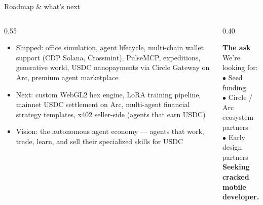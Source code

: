 \documentclass[aspectratio=169]{beamer}
\begin{document}
\begin{frame}{Roadmap \& what's next}
  \vspace{16pt}
  \begin{columns}[T]
    \begin{column}{0.55\textwidth}
      \begin{itemize}
        \footnotesize
        \item \alert{Shipped:} office simulation, agent lifecycle, multi-chain wallet support (CDP Solana, Crossmint), PulseMCP, expeditions, generative world, USDC nanopayments via Circle Gateway on Arc, premium agent marketplace
        \item \alert{Next:} custom WebGL2 hex engine, LoRA training pipeline, mainnet USDC settlement on Arc, multi-agent financial strategy templates, x402 seller-side (agents that earn USDC)
        \item \alert{Vision:} the autonomous agent economy --- agents that work, trade, learn, and sell their specialized skills for USDC
      \end{itemize}
    \end{column}
    \begin{column}{0.40\textwidth}
      \begin{tcolorbox}[colback=accent, colframe=accent, sharp corners, boxrule=0pt]
        \color{white}\small
        \textbf{The ask}\\[4pt]
        We're looking for:\\[4pt]
        $\bullet$ Seed funding\\
        $\bullet$ Circle / Arc ecosystem partners\\
        $\bullet$ Early design partners\\[6pt]
        \textbf{\color{warn}Seeking cracked mobile developer.}
      \end{tcolorbox}
    \end{column}
  \end{columns}
\end{frame}
\end{document}
